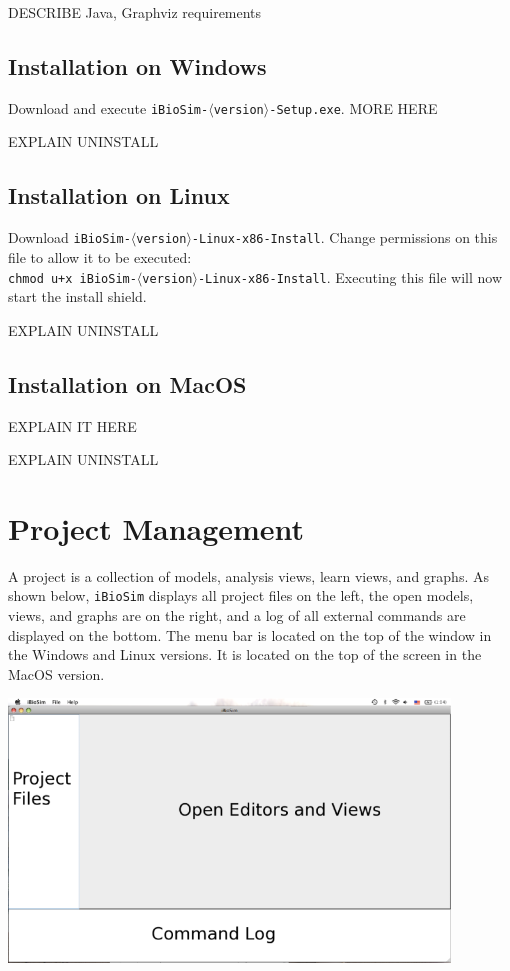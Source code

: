 \documentclass[titlepage,11pt]{article}
\begin{document}
DESCRIBE Java, Graphviz requirements

\subsection{Installation on Windows}

\noindent
Download and execute {\tt iBioSim-$\langle$version$\rangle$-Setup.exe}.
MORE HERE

EXPLAIN UNINSTALL

\subsection{Installation on Linux}

\noindent
Download {\tt iBioSim-$\langle$version$\rangle$-Linux-x86-Install}.
Change permissions on this file to allow it to be executed:\\
{\tt chmod u+x iBioSim-$\langle$version$\rangle$-Linux-x86-Install}.
Executing this file will now start the install shield.

EXPLAIN UNINSTALL

\subsection{Installation on MacOS}

\noindent
EXPLAIN IT HERE

EXPLAIN UNINSTALL

\section{Project Management}

\noindent
A project is a collection of models, analysis views, learn
views, and graphs.  As shown below, {\tt iBioSim} displays all project
files on the left, the open models, views, and graphs are on the
right, and a log of all external commands are displayed on the bottom.
The menu bar is located on the top of the window in the Windows and
Linux versions.  It is located on the top of the screen in the MacOS version.
\begin{center}
\includegraphics[height=70mm]{screenshots/iBioSim}
\end{center}
\end{document}
